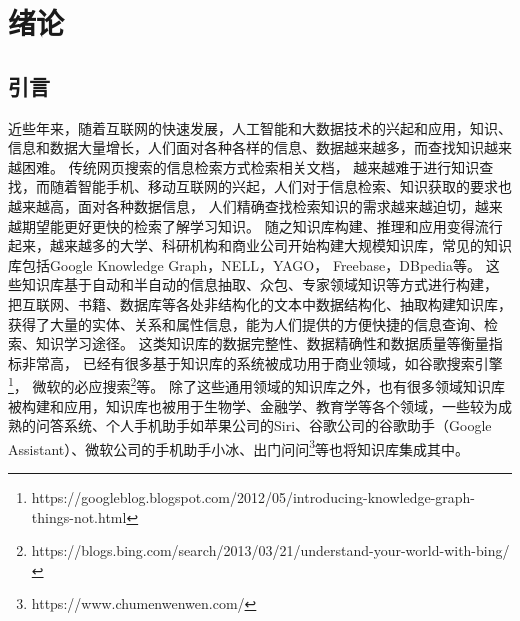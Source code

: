 

\chapter{绪论}
\label{cha:intro}
\section{引言}

近些年来，随着互联网的快速发展，人工智能和大数据技术的兴起和应用，知识、信息和数据大量增长，人们面对各种各样的信息、数据越来越多，而查找知识越来越困难。
传统网页搜索的信息检索方式检索相关文档，
越来越难于进行知识查找，而随着智能手机、移动互联网的兴起，人们对于信息检索、知识获取的要求也越来越高，面对各种数据信息，
人们精确查找检索知识的需求越来越迫切，越来越期望能更好更快的检索了解学习知识。
随之知识库构建、推理和应用变得流行起来，越来越多的大学、科研机构和商业公司开始构建大规模知识库，常见的知识库包括Google Knowledge Graph\cite{Dong2014FromDF}，NELL\cite{NELL-aaai15}，YAGO\cite{Suchanek:2007:YCS:1242572.1242667}，
Freebase\cite{Bollacker2008FreebaseAC}，DBpedia\cite{Bizer:2009:DCP:1640541.1640848}等。
这些知识库基于自动和半自动的信息抽取\cite{Gao2005KnowledgeBasedIE}、众包\cite{Meng2017KnowledgeBS}、专家领域知识\cite{Shenassa2008KnowledgeBE}等方式进行构建，
把互联网、书籍、数据库等各处非结构化的文本中数据结构化、抽取构建知识库，
获得了大量的实体、关系和属性信息，能为人们提供的方便快捷的信息查询、检索、知识学习途径。
这类知识库的数据完整性、数据精确性和数据质量等衡量指标非常高，
已经有很多基于知识库的系统被成功用于商业领域，如谷歌搜索引擎\footnote{https://googleblog.blogspot.com/2012/05/introducing-knowledge-graph-things-not.html}，
微软的必应搜索\footnote{https://blogs.bing.com/search/2013/03/21/understand-your-world-with-bing/}等。
除了这些通用领域的知识库之外，也有很多领域知识库被构建和应用，知识库也被用于生物学\cite{Dumontier:2014:BRL:2878453.2878554}、金融学、教育学等各个领域，一些较为成熟的问答系统、个人手机助手如苹果公司的Siri、谷歌公司的谷歌助手（Google Assistant）、微软公司的手机助手小冰、出门问问\footnote{https://www.chumenwenwen.com/}等也将知识库集成其中。

